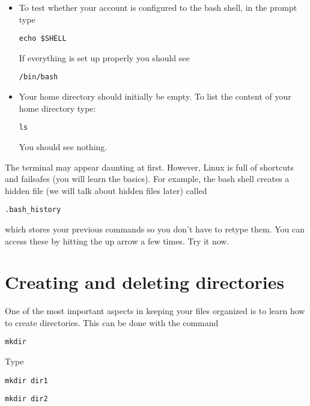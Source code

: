 \documentclass[aps,showpacs,prd,notitlepage,preprintnumbers,amsmath,amssymb,letterpaper]{revtex4}
\begin{document}
\begin{itemize}[leftmargin=*,itemsep=0.05em]
\item To test whether your account is configured to the bash shell, in the
prompt type

\begin{verbatim}
echo $SHELL
\end{verbatim}

If everything is set up properly you should see

\begin{verbatim}
/bin/bash
\end{verbatim}

\item Your home directory should initially be empty. To list the content of your home directory type:

\begin{verbatim}
ls
\end{verbatim}
  
You should see nothing.

  
\end{itemize}

The terminal may appear daunting at first. However, Linux is full of
shortcuts and failsafes (you will learn the basics). For example, the
bash shell creates a hidden file (we will talk about hidden files
later) called \begin{verbatim}.bash_history\end{verbatim} which stores
  your previous commands so you don't have to retype them. You can
  access these by hitting the up arrow a few times. Try it now.


\section{Creating and deleting directories}

One of the most important aspects in keeping your files organized is to learn how to create directories. This can be done with the command

\begin{verbatim}
mkdir
\end{verbatim}

Type


\begin{verbatim}
mkdir dir1 
\end{verbatim}

\begin{verbatim}
mkdir dir2
\end{verbatim}
\end{document}
